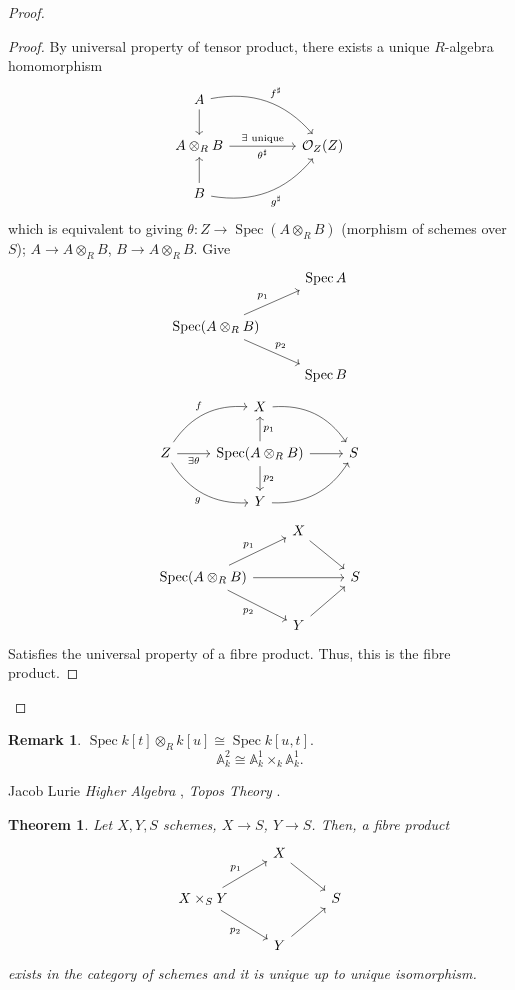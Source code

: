 \documentclass[12pt]{article}
\DeclareMathOperator{\Spec}{Spec}
\newtheorem*{theorem}{Theorem}
\theoremstyle{definition}
\newtheorem*{remark}{Remark}
\begin{document}
\begin{proof}
\begin{itemize}[label=$-$]
\begin{proof}
By universal property of tensor product, there exists a unique $R$-algebra homomorphism
\[
\begin{tikzcd}
A\arrow[rrd,"f^{\sharp}",bend left]\arrow[d]\\
A\otimes_RB\arrow[rr,"\exists\text{ unique}","\theta^{\sharp}"']&&\mathcal{O}_Z(Z)\\
B\arrow[u]\arrow[rru,"g^{\sharp}",swap,bend right]
\end{tikzcd}
\]
which is equivalent to giving $\theta:Z\rightarrow\Spec(A\otimes_RB)$ (morphism of schemes over $S$); $A\rightarrow A\otimes_RB$, $B\rightarrow A\otimes_RB$. Give
\[
\begin{tikzcd}
&\Spec A\\
\Spec(A\otimes_RB)\arrow[ru,"p_1"]\arrow[rd,"p_2"]\\
&\Spec B
\end{tikzcd}
\]
\[
\begin{tikzcd}
&X\arrow[rd,bend left]\\
Z\arrow[ru,"f",bend left]\arrow[r,"\exists\theta",swap]\arrow[rd,"g",bend right,swap]&\Spec(A\otimes_RB)\arrow[u,"p_1",swap]\arrow[r]\arrow[d,"p_2"]&S\\
&Y\arrow[ru,bend right]
\end{tikzcd}
\]
\[
\begin{tikzcd}
&X\arrow[rd]\\
\Spec(A\otimes_RB)\arrow[ru,"p_1"]\arrow[rd,"p_2",swap]\arrow[rr]&&S\\
&Y\arrow[ru]
\end{tikzcd}
\]
Satisfies the universal property of a fibre product. Thus, this is the fibre product.
\end{proof}
\end{itemize}
\end{proof}

\begin{remark}
$\Spec k[t]\otimes_Rk[u]\cong\Spec k[u,t]$.
\[\mathbb{A}_k^2\cong\mathbb{A}_k^1\times_k\mathbb{A}_k^1.\]
\end{remark}

Jacob Lurie \emph{Higher Algebra} \cite{lurie2017higher}, \emph{Topos Theory} \cite{lurie2009higher}.

\begin{theorem}
Let $X,Y,S$ schemes, $X\rightarrow S$, $Y\rightarrow S$. Then, a fibre product
\[
\begin{tikzcd}
&X\arrow[rd]\\
X\times_SY\arrow[ru,"p_1"]\arrow[rd,"p_2",swap]&&S\\
&Y\arrow[ru]
\end{tikzcd}
\]
exists in the category of schemes and it is unique up to unique isomorphism.
\end{theorem}
\end{document}
